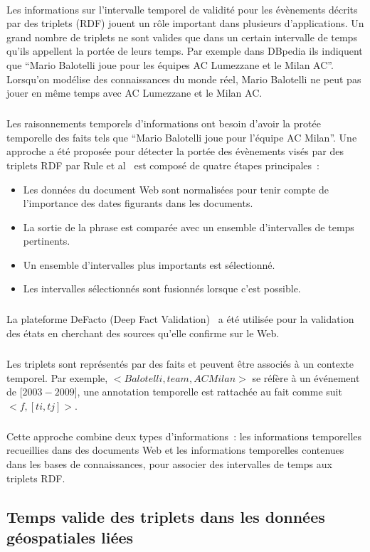 \documentclass[12pt,a4]{report}
\begin{document}
\paragraph{}
Les informations sur l'intervalle temporel de validité pour les évènements décrits par des triplets (RDF) jouent un rôle important dans plusieurs d'applications.
Un grand nombre de triplets ne sont valides que dans un certain intervalle de temps qu'ils appellent la portée de leurs temps.
Par exemple dans DBpedia ils indiquent que ``Mario Balotelli joue pour les équipes AC Lumezzane et le Milan AC''. Lorsqu'on modélise des connaissances du monde réel, Mario Balotelli ne peut pas jouer en même temps avec AC Lumezzane et le Milan AC.
\subparagraph{}
Les raisonnements temporels d'informations ont besoin d'avoir la protée temporelle des faits tels que ``Mario Balotelli joue pour l'équipe AC Milan''.
Une approche a été proposée pour détecter la portée des évènements visés par des triplets RDF par Rule et al~\cite{rula2014} est composé de quatre étapes principales~:
\begin{itemize}
\item Les données du document Web sont normalisées pour tenir compte de l’importance des dates figurants dans les documents.
\item La sortie de la phrase est comparée avec un ensemble d’intervalles de temps pertinents.
\item Un ensemble d’intervalles plus importants est sélectionné.
\item Les intervalles sélectionnés sont fusionnés lorsque c’est possible.
\end{itemize}
\subparagraph{}
La plateforme DeFacto (Deep Fact Validation)~\cite{lehmann2012} a été utilisée pour la validation des états en cherchant des sources qu'elle confirme sur le Web.
\subparagraph{}
Les triplets sont représentés par des faits et peuvent être associés à un contexte temporel.
Par exemple, $<Balotelli, team, AC Milan>$ se réfère à un événement de [$2003-2009$], une annotation temporelle est rattachée au fait comme suit $<f, [ti,tj]>$.
\subparagraph{}
Cette approche combine deux types d'informations~: les informations temporelles recueillies dans des documents Web et les informations temporelles contenues dans les bases de connaissances, pour associer des intervalles de temps aux triplets RDF.
\subsection{Temps valide des triplets dans les données géospatiales liées}
\end{document}
